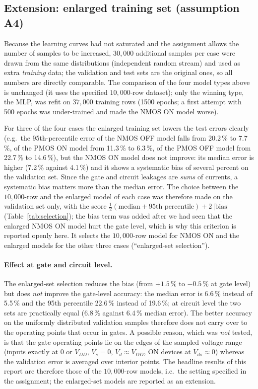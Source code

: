 \subsection{Extension: enlarged training set (assumption A4)}\label{sec:enlarged}
Because the learning curves had not saturated and the assignment allows the number of samples to be increased, $30{,}000$ additional samples per case were drawn from the same distributions
(independent random stream) and used as extra \emph{training} data; the validation and test sets are the original ones, so all numbers are directly comparable. The comparison of the four model types
above is unchanged (it uses the specified $10{,}000$-row dataset); only the winning type, the MLP, was refit on $37{,}000$ training rows (1500 epochs; a first attempt with 500 epochs was under-trained and made the NMOS ON model worse).

For three of the four cases the enlarged training set lowers the test errors clearly (e.g.\ the 95th-percentile error of the NMOS OFF model falls from 20.2\,\% to 7.7\,\%, of the PMOS ON model from 11.3\,\% to 6.3\,\%, of the PMOS OFF model from 22.7\,\% to 14.6\,\%),
but the NMOS ON model does not improve: its median error is higher (7.2\,\% against 4.1\,\%) and it shows a systematic bias of several percent on the validation set.
Since the gate and circuit leakages are \emph{sums} of currents, a systematic bias matters more than the median error. The choice between the $10{,}000$-row and the enlarged model of each case was therefore made on the validation set only, with the score
$\tfrac12(\text{median}+\text{95th percentile})+2\,\overline{|\text{bias}|}$ (Table~\ref{tab:selection}); the bias term was added after we had seen that the enlarged NMOS ON model hurt the gate level, which is why this criterion is reported openly here.
It selects the $10{,}000$-row model for NMOS ON and the enlarged models for the other three cases (``enlarged-set selection'').


\paragraph{Effect at gate and circuit level.}

The enlarged-set selection reduces the bias (from $+1.5\,\%$ to $-0.5\,\%$ at gate level) but does \emph{not} improve the gate-level accuracy: the median error is 6.6\,\% instead of 5.5\,\% and the 95th percentile 22.6\,\% instead of 19.6\,\%;
at circuit level the two sets are practically equal (6.8\,\% against 6.4\,\% median error). The better accuracy on the uniformly distributed validation samples therefore does not carry over to the operating points that occur in gates.
A possible reason, which was \emph{not} tested, is that the gate operating points lie on the edges of the sampled voltage range (inputs exactly at $0$ or $V_{DD}$, $V_s=0$, $V_d\approx V_{DD}$, ON devices at $V_{ds}\approx0$) whereas the validation error is averaged over interior points.
The headline results of this report are therefore those of the $10{,}000$-row models, i.e.\ the setting specified in the assignment; the enlarged-set models are reported as an extension.
